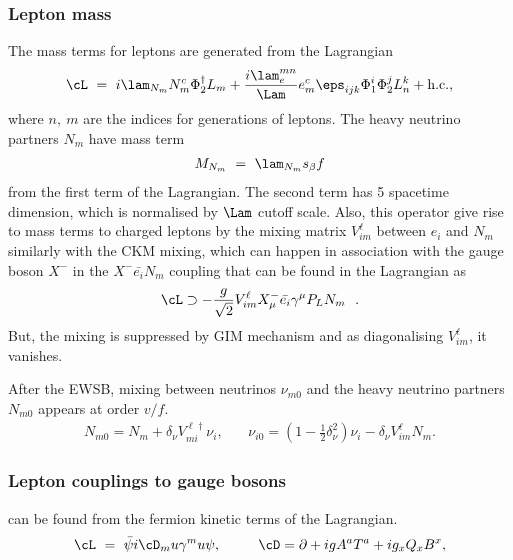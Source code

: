 \subsubsection*{Lepton mass}
The mass terms for leptons are generated from the Lagrangian
\begin{align}
 \cL ~=~ i \lam_{N_m} N_m^c \Phi_2^\dagger L_m 
 + \frac{i \lam_e^{mn}}{\Lam}e_m^c \eps_{ijk}\Phi_1^i \Phi_2^j L_n^k + {\rm{h.c.}}, 
\end{align}
where $n,~m$ are the indices for generations of leptons. 
The heavy neutrino partners $N_m$ have mass term
\begin{align}
 M_{N_m} ~=~ \lam_{N_m}s_\beta f \nonumber
\end{align}
from the first term of the Lagrangian. 
The second term has 5 spacetime dimension, which is normalised by $\Lam$ cutoff scale. 
Also, this operator give rise to mass terms to charged leptons 
by the mixing matrix $V_{im}^\ell$ between $e_i$ and $N_m$ similarly with the CKM mixing,
which can happen in association with the gauge boson $X^-$ in the $X^- \bar{e_i} N_m$ coupling 
that can be found in the Lagrangian as
\begin{align}
 \cL \supset -\frac{g}{\sqrt{2}} V_{im}^\ell X_\mu^- \bar{e_i}\gamma^\mu P_L N_m~~ .
\end{align}
But, the mixing is suppressed by GIM mechanism and as diagonalising $V_{im}^\ell$, it vanishes.



After the EWSB, mixing between neutrinos $\nu_{m0}$ and the heavy neutrino partners $N_{m0}$ appears at order $v/f$.
\begin{align}
 N_{m0} = N_{m} + \delta_\nu V_{mi}^{\ell\dagger} \nu_i, ~~~~~~~~
 \nu_{i0} = (1-\frac{1}{2}\delta_\nu^2) \nu_i - \delta_\nu V_{im}^\ell N_m .
\end{align}





\subsubsection*{Lepton couplings to gauge bosons} 
can be found from the fermion kinetic terms of the Lagrangian. 
\begin{align}
 \cL~=~\bar{\psi}i\cD_mu \gamma^mu \psi, ~~~~~~~~
 \cD = \partial + ig A^a T^a + ig_x Q_x B^x, 
\end{align}




